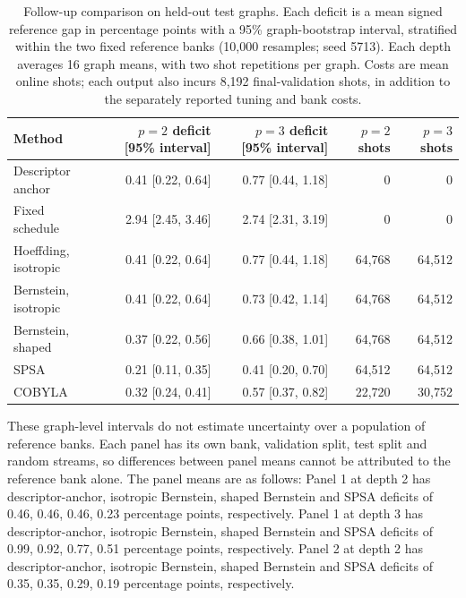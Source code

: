 \begin{table}[t]
\caption{Follow-up comparison on held-out test graphs. Each deficit is a mean signed reference gap in percentage points with a 95\% graph-bootstrap interval, stratified within the two fixed reference banks (10,000 resamples; seed 5713). Each depth averages 16 graph means, with two shot repetitions per graph. Costs are mean online shots; each output also incurs 8,192 final-validation shots, in addition to the separately reported tuning and bank costs.}\label{tab:followup}
\centering\small\setlength{\tabcolsep}{4pt}
\begin{tabular}{lrrrr}
\toprule
Method & \shortstack{$p=2$ deficit\\{[95\% interval]}} & \shortstack{$p=3$ deficit\\{[95\% interval]}} & \shortstack{$p=2$\\shots} & \shortstack{$p=3$\\shots} \\
\midrule
Descriptor anchor & 0.41 [0.22, 0.64] & 0.77 [0.44, 1.18] & 0 & 0 \\
Fixed schedule & 2.94 [2.45, 3.46] & 2.74 [2.31, 3.19] & 0 & 0 \\
Hoeffding, isotropic & 0.41 [0.22, 0.64] & 0.77 [0.44, 1.18] & 64,768 & 64,512 \\
Bernstein, isotropic & 0.41 [0.22, 0.64] & 0.73 [0.42, 1.14] & 64,768 & 64,512 \\
Bernstein, shaped & 0.37 [0.22, 0.56] & 0.66 [0.38, 1.01] & 64,768 & 64,512 \\
SPSA & 0.21 [0.11, 0.35] & 0.41 [0.20, 0.70] & 64,512 & 64,512 \\
COBYLA & 0.32 [0.24, 0.41] & 0.57 [0.37, 0.82] & 22,720 & 30,752 \\
\bottomrule
\end{tabular}
\end{table}
These graph-level intervals do not estimate uncertainty over a population of reference banks. Each panel has its own bank, validation split, test split and random streams, so differences between panel means cannot be attributed to the reference bank alone. The panel means are as follows:
Panel 1 at depth 2 has descriptor-anchor, isotropic Bernstein, shaped Bernstein and SPSA deficits of 0.46, 0.46, 0.46, 0.23 percentage points, respectively.
Panel 1 at depth 3 has descriptor-anchor, isotropic Bernstein, shaped Bernstein and SPSA deficits of 0.99, 0.92, 0.77, 0.51 percentage points, respectively.
Panel 2 at depth 2 has descriptor-anchor, isotropic Bernstein, shaped Bernstein and SPSA deficits of 0.35, 0.35, 0.29, 0.19 percentage points, respectively.
